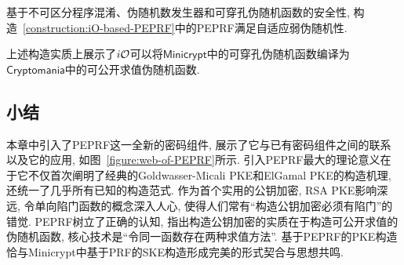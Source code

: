 \begin{theorem}
基于不可区分程序混淆、伪随机数发生器和可穿孔伪随机函数的安全性, 构造~\ref{construction:iO-based-PEPRF}中的PEPRF满足自适应弱伪随机性. 
\end{theorem}

\begin{remark}
    上述构造实质上展示了$i\mathcal{O}$可以将$\mathsf{Minicrypt}$中的可穿孔伪随机函数编译为$\mathsf{Cryptomania}$中的可公开求值伪随机函数.
\end{remark}


\subsection{小结}
本章中引入了PEPRF这一全新的密码组件, 展示了它与已有密码组件之间的联系以及它的应用, 如图~\ref{figure:web-of-PEPRF}所示. 
引入PEPRF最大的理论意义在于它不仅首次阐明了经典的Goldwasser-Micali PKE和ElGamal PKE的构造机理, 
还统一了几乎所有已知的构造范式. 
作为首个实用的公钥加密, RSA PKE影响深远, 令单向陷门函数的概念深入人心, 使得人们常有``构造公钥加密必须有陷门''的错觉. 
PEPRF树立了正确的认知, 指出构造公钥加密的实质在于构造可公开求值的伪随机函数, 核心技术是``令同一函数存在两种求值方法''.  
基于PEPRF的PKE构造恰与Minicrypt中基于PRF的SKE构造形成完美的形式契合与思想共鸣. 

